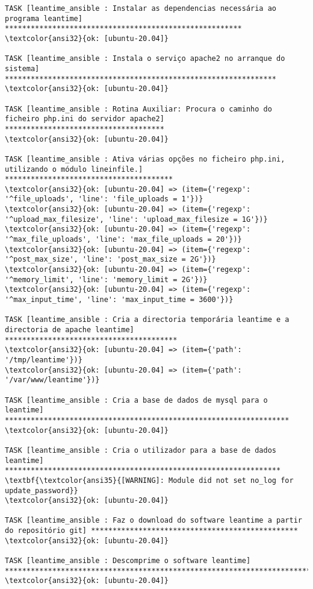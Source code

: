 \documentclass{scrartcl}
\begin{document}
\begin{Verbatim}
TASK [leantime_ansible : Instalar as dependencias necessária ao programa leantime] *******************************************************
\textcolor{ansi32}{ok: [ubuntu-20.04]}

TASK [leantime_ansible : Instala o serviço apache2 no arranque do sistema] ***************************************************************
\textcolor{ansi32}{ok: [ubuntu-20.04]}

TASK [leantime_ansible : Rotina Auxiliar: Procura o caminho do ficheiro php.ini do servidor apache2] *************************************
\textcolor{ansi32}{ok: [ubuntu-20.04]}

TASK [leantime_ansible : Ativa várias opções no ficheiro php.ini, utilizando o módulo lineinfile.] ***************************************
\textcolor{ansi32}{ok: [ubuntu-20.04] => (item={'regexp': '^file_uploads', 'line': 'file_uploads = 1'})}
\textcolor{ansi32}{ok: [ubuntu-20.04] => (item={'regexp': '^upload_max_filesize', 'line': 'upload_max_filesize = 1G'})}
\textcolor{ansi32}{ok: [ubuntu-20.04] => (item={'regexp': '^max_file_uploads', 'line': 'max_file_uploads = 20'})}
\textcolor{ansi32}{ok: [ubuntu-20.04] => (item={'regexp': '^post_max_size', 'line': 'post_max_size = 2G'})}
\textcolor{ansi32}{ok: [ubuntu-20.04] => (item={'regexp': '^memory_limit', 'line': 'memory_limit = 2G'})}
\textcolor{ansi32}{ok: [ubuntu-20.04] => (item={'regexp': '^max_input_time', 'line': 'max_input_time = 3600'})}

TASK [leantime_ansible : Cria a directoria temporária leantime e a directoria de apache leantime] ****************************************
\textcolor{ansi32}{ok: [ubuntu-20.04] => (item={'path': '/tmp/leantime'})}
\textcolor{ansi32}{ok: [ubuntu-20.04] => (item={'path': '/var/www/leantime'})}

TASK [leantime_ansible : Cria a base de dados de mysql para o leantime] ******************************************************************
\textcolor{ansi32}{ok: [ubuntu-20.04]}

TASK [leantime_ansible : Cria o utilizador para a base de dados leantime] ****************************************************************
\textbf{\textcolor{ansi35}{[WARNING]: Module did not set no_log for update_password}}
\textcolor{ansi32}{ok: [ubuntu-20.04]}

TASK [leantime_ansible : Faz o download do software leantime a partir do repositório git] ************************************************
\textcolor{ansi32}{ok: [ubuntu-20.04]}

TASK [leantime_ansible : Descomprime o software leantime] ********************************************************************************
\textcolor{ansi32}{ok: [ubuntu-20.04]}


\end{Verbatim}
\end{document}
